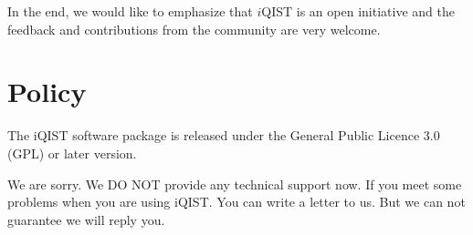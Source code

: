 In the end, we would like to emphasize that $i$QIST is an open initiative and the feedback and contributions from the community are very welcome.

\section{Policy}

The iQIST software package is released under the General Public Licence 3.0 (GPL) or later version.

We are sorry. We DO NOT provide any technical support now. If you meet some problems when you are using iQIST. You can write a letter to us. But we can not guarantee we will reply you.
